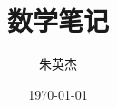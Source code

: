 \documentclass[12pt,a4paper]{ctexbook}
\title{数学笔记}
\author{朱英杰}
\date{\today}
\begin{document}
\newcommand{\wvert}{\,\vert\,}
\renewcommand{\newline}{~}
\setcounter{nproof}{1}  %
\newcommand{\nextproof}{\roman{nproof}\stepcounter{nproof}}



\end{document}
